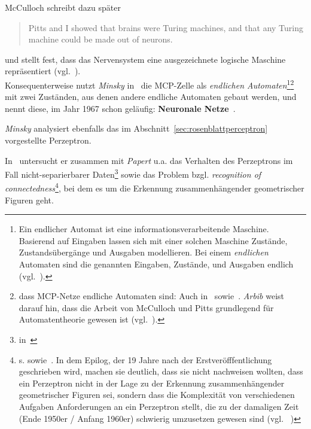 McCulloch schreibt dazu später

\blockquote[{\cite[164]{Mcc16}}]{
    Pitts and I showed that brains were Turing machines, and that any Turing machine could be made out of neurons.
}

\noindent
und stellt fest, dass das Nervensystem eine ausgezeichnete logische Maschine repräsentiert (vgl.~\cite[80]{Mcc16}).\\


Konsequenterweise nutzt \textit{Minsky} in~\cite[32 ff.]{Min67} die MCP-Zelle als \textit{endlichen Automaten}\footnote{
    Ein endlicher Automat ist eine informationsverarbeitende Maschine. Basierend auf Eingaben lassen sich mit einer solchen Maschine Zustände, Zustandsübergänge und Ausgaben modellieren. Bei einem \textit{endlichen} Automaten sind die genannten Eingaben, Zustände, und Ausgaben endlich (vgl.~\cite[26 ff.]{SSH95}).
}\footnote{
    dass MCP-Netze endliche Automaten sind: Auch in~\cite[76]{Cow90} sowie~\cite[47, ``Satz 2.4``]{Roj93}. \textit{Arbib} weist darauf hin, dass die Arbeit von McCulloch und Pitts grundlegend für Automatentheorie gewesen ist (vgl.~\cite[8]{Arb19}).
} mit zwei Zuständen, aus denen andere endliche Automaten gebaut werden, und nennt diese, im Jahr 1967 schon geläufig: \textbf{Neuronale Netze}~\cite[33]{Min67}.

%

\textit{Minsky} analysiert ebenfalls das im Abschnitt~\ref{sec:rosenblattperceptron} vorgestellte Perzeptron.


In~\cite{MP88} untersucht er zusammen mit \textit{Papert} u.a. das Verhalten des Perzeptrons im Fall nicht-separierbarer Daten\footnote{
    in~\cite[181 ff.]{MP88}
} sowie das Problem bzgl. \textit{recognition of connectedness}\footnote{
    s. \cite[12, ``Theorem 0.8``]{MP88} sowie~\cite[249 f.]{MP88}. In dem Epilog, der 19 Jahre nach der Erstveröfffentlichung geschrieben wird, machen sie deutlich, dass sie nicht nachweisen wollten, dass ein Perzeptron nicht in der Lage zu der Erkennung zusammenhängender geometrischer Figuren sei, sondern dass die Komplexität von verschiedenen Aufgaben Anforderungen an ein Perzeptron stellt, die zu der damaligen Zeit (Ende 1950er / Anfang 1960er) schwierig umzusetzen gewesen sind (vgl. ~\cite[250]{MP88})
}, bei dem es um die Erkennung zusammenhängender geometrischer Figuren geht.

